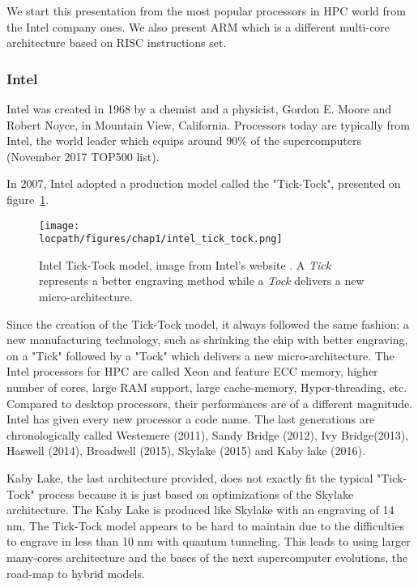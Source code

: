 We start this presentation from the most popular processors in HPC world from the Intel company ones. 
We also present ARM which is a different multi-core architecture based on RISC instructions set.

\subsubsection{Intel}
Intel was created in 1968 by a chemist and a physicist, Gordon E. Moore and Robert Noyce, in Mountain View, California. 
Processors today are typically from Intel, the world leader which equips around 90\% of the supercomputers (November 2017 TOP500 list).

In 2007, Intel adopted a production model called the "Tick-Tock", presented on figure~\ref{fig:1_HPC:intel_tick_tock}.
\begin{figure}[t!]
\begin{center}
\texttt{[image: \\locpath/figures/chap1/intel\_tick\_tock.png]}
\caption[Intel Tick-Tock model]{Intel Tick-Tock model, image from Intel's website \protect\footnotemark. A \textit{Tick} represents a better engraving method while a \textit{Tock} delivers a new micro-architecture.}
\label{fig:1_HPC:intel_tick_tock}
\end{center}
\end{figure}
Since the creation of the Tick-Tock model, it always followed the same fashion: a new manufacturing technology, such as shrinking the chip with better engraving, on a "Tick" followed by a "Tock" which delivers a new micro-architecture.
The Intel processors for HPC are called Xeon and feature ECC memory, higher number of cores, large RAM support, large cache-memory, Hyper-threading, etc. 
Compared to desktop processors, their performances are of a different magnitude.
Intel has given every new processor a code name. 
The last generations are chronologically called Westemere (2011), Sandy Bridge (2012), Ivy Bridge(2013), Haswell (2014), Broadwell (2015), Skylake (2015) and Kaby lake (2016). 

Kaby Lake, the last architecture provided, does not exactly fit the typical "Tick-Tock" process because it is just based on optimizations of the Skylake architecture. 
The Kaby Lake is produced like Skylake with an engraving of 14 nm.
The Tick-Tock model appears to be hard to maintain due to the difficulties to engrave in less than 10 nm with quantum tunneling. 
This leads to using larger many-cores architecture and the bases of the next supercomputer evolutions, the road-map to hybrid models. 

